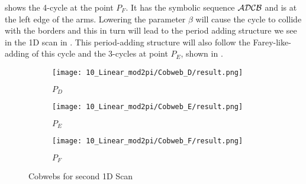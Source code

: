  shows the 4-cycle at the point $P_F$.
It has the symbolic sequence $\mathcal{A}\mathcal{D}\mathcal{C}\mathcal{B}$ and is at the left edge of the arms.
Lowering the parameter $\beta$ will cause the cycle to collide with the borders and this in turn will lead to the period adding structure we see in the 1D scan in .
This period-adding structure will also follow the Farey-like-adding of this cycle and the 3-cycles at point $P_E$, shown in .

\begin{figure}
    \centering
    \begin{subfigure}{0.3\textwidth}
        \centering
        \texttt{[image: 10\_Linear\_mod2pi/Cobweb\_D/result.png]}
        \caption{$P_D$}
        \label{fig:pcw.lin.CobwebD}
    \end{subfigure}
    \begin{subfigure}{0.3\textwidth}
        \centering
        \texttt{[image: 10\_Linear\_mod2pi/Cobweb\_E/result.png]}
        \caption{$P_E$}
        \label{fig:pcw.lin.CobwebE}
    \end{subfigure}
    \begin{subfigure}{0.3\textwidth}
        \centering
        \texttt{[image: 10\_Linear\_mod2pi/Cobweb\_F/result.png]}
        \caption{$P_F$}
        \label{fig:pcw.lin.CobwebF}
    \end{subfigure}
    \caption{Cobwebs for second 1D Scan}
    \label{fig:pcw.lin.CobwebD-F}
\end{figure}
